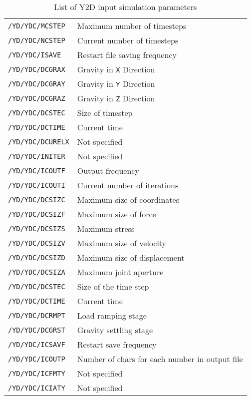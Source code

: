 \newpage
\appendix

\newcommand{\hbAppendixPrefix}{A}
%
\renewcommand{\thefigure}{\hbAppendixPrefix\arabic{figure}}
\setcounter{figure}{0}
\renewcommand{\thetable}{\hbAppendixPrefix\arabic{table}} 
\setcounter{table}{0}
\renewcommand{\theequation}{\hbAppendixPrefix\arabic{equation}} 
\setcounter{equation}{0}

\begin{table}
    \caption{List of Y2D input simulation parameters \cite{Munjiza2000a}}
    \begin{tabularx}{\columnwidth}{ll}
    \\\midrule
    \texttt{/YD/YDC/MCSTEP} & Maximum number of timesteps\\
    \texttt{/YD/YDC/NCSTEP} & Current number of timesteps\\
    \texttt{/YD/YDC/ISAVE}  & Restart file saving frequency\\
    \texttt{/YD/YDC/DCGRAX} & Gravity in \texttt{X} Direction\\
    \texttt{/YD/YDC/DCGRAY} & Gravity in \texttt{Y} Direction\\
    \texttt{/YD/YDC/DCGRAZ} & Gravity in \texttt{Z} Direction\\
    \texttt{/YD/YDC/DCSTEC} & Size of timestep\\
    \texttt{/YD/YDC/DCTIME} & Current time\\
    \texttt{/YD/YDC/DCURELX}& Not specified\\
    \texttt{/YD/YDC/INITER} & Not specified\\
    \texttt{/YD/YDC/ICOUTF} & Output frequency\\
    \texttt{/YD/YDC/ICOUTI} & Current number of iterations\\
    \texttt{/YD/YDC/DCSIZC} & Maximum size of coordinates\\
    \texttt{/YD/YDC/DCSIZF} & Maximum size of force\\
    \texttt{/YD/YDC/DCSIZS} & Maximum stress\\
    \texttt{/YD/YDC/DCSIZV} & Maximum size of velocity\\
    \texttt{/YD/YDC/DCSIZD} & Maximum size of displacement\\
    \texttt{/YD/YDC/DCSIZA} & Maximum joint aperture\\
    \texttt{/YD/YDC/DCSTEC} & Size of the time step\\
    \texttt{/YD/YDC/DCTIME} & Current time\\
    \texttt{/YD/YDC/DCRMPT} & Load ramping stage\\
    \texttt{/YD/YDC/DCGRST} & Gravity settling stage\\
    \texttt{/YD/YDC/ICSAVF} & Restart save frequency\\
    \texttt{/YD/YDC/ICOUTP} & Number of chars for each number in output file \\
    \texttt{/YD/YDC/ICFMTY} & Not specified\\
    \texttt{/YD/YDC/ICIATY} & Not specified\\\bottomrule
  \end{tabularx}
  \label{tab:inpar}
\end{table}